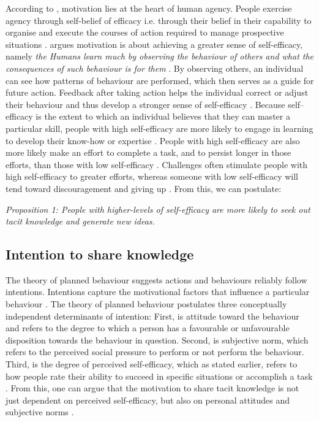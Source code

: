 According to \citet{bandura1989human}, motivation lies at the heart of human agency. People exercise agency through self-belief of efficacy i.e. through their belief in their capability to organise and execute the courses of action required to manage prospective situations \citep{bandura1994self}. \citet{white1959motivation} argues motivation is about achieving a greater sense of self-efficacy, namely \emph{the  Humans learn much by observing the behaviour of others and what the consequences of such behaviour is for them} \citep{bandura1999social}. By observing others, an individual can see how patterns of behaviour are performed, which then serves as a guide for future action. Feedback after taking action helps the individual correct or adjust their behaviour and thus develop a stronger sense of self-efficacy \citep{bandura1977self}. Because self–efficacy is the extent to which an individual believes that they can master a particular skill, people with high self-efficacy are more likely to engage in learning to develop their know-how or expertise \citep{bandura1986social,gist1989influence,zimmerman2000self}. People with high self-efficacy are also more likely make an effort to complete a task, and to persist longer in those efforts, than those with low self-efficacy \citep{schunk1990goal}. Challenges often stimulate people with high self-efficacy to greater efforts, whereas someone with low self-efficacy will tend toward discouragement and giving up \citep{gist1992self,zimmerman1992self}. From this, we can postulate:

\emph{Proposition 1: People with higher-levels of self-efficacy are more likely to seek out tacit knowledge and generate new ideas.}




\subsection{Intention to share knowledge}

The theory of planned behaviour suggests actions and behaviours reliably follow intentions. Intentions capture the motivational factors that influence a particular behaviour \citep{ajzen1985intentions}. The theory of planned behaviour postulates three conceptually independent determinants of intention: First, is attitude toward the behaviour and refers to the degree to which a person has a favourable or unfavourable disposition towards the behaviour in question. Second, is subjective norm, which refers to the perceived social pressure to perform or not perform the behaviour. Third, is the degree of perceived self-efficacy, which as stated earlier, refers to how people rate their ability to succeed in specific situations or accomplish a task \citep{bandura1977self,bandura1982self,ajzen1991theory}. From this, one can argue that the motivation to share tacit knowledge is not just dependent on perceived self-efficacy, but also on personal attitudes and subjective norms \citep{gagne2009model,chen2012behavioral}. \medskip

